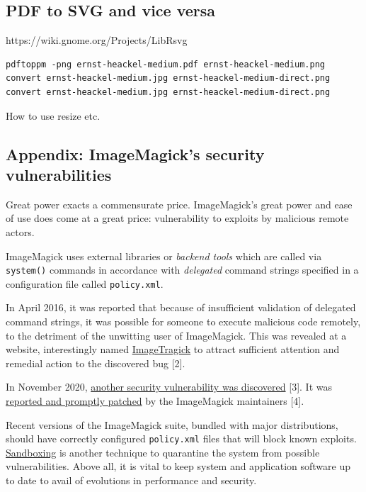 \documentclass[
  11pt,
  british,
  a4paper,
]{article}
\begin{document}
\hypertarget{pdf-to-svg-and-vice-versa}{%
\subsection{PDF to SVG and vice versa}\label{pdf-to-svg-and-vice-versa}}

https://wiki.gnome.org/Projects/LibRsvg

\begin{verbatim}
pdftoppm -png ernst-heackel-medium.pdf ernst-heackel-medium.png
convert ernst-heackel-medium.jpg ernst-heackel-medium-direct.png
convert ernst-heackel-medium.jpg ernst-heackel-medium-direct.png
\end{verbatim}

How to use resize etc.

\hypertarget{appendix-imagemagicks-security-vulnerabilities}{%
\subsection{Appendix: ImageMagick's security
vulnerabilities}\label{appendix-imagemagicks-security-vulnerabilities}}

Great power exacts a commensurate price. ImageMagick's great power and
ease of use does come at a great price: vulnerability to exploits by
malicious remote actors.

ImageMagick uses external libraries or \emph{backend tools} which are
called via \texttt{system()} commands in accordance with
\emph{delegated} command strings specified in a configuration file
called \texttt{policy.xml}.

In April 2016, it was reported that because of insufficient validation
of delegated command strings, it was possible for someone to execute
malicious code remotely, to the detriment of the unwitting user of
ImageMagick. This was revealed at a website, interestingly named
\href{https://imagetragick.com/}{ImageTragick} to attract sufficient
attention and remedial action to the discovered bug {[}2{]}.

In November 2020,
\href{https://portswigger.net/daily-swig/imagemagick-pdf-parsing-flaw-allowed-attacker-to-execute-shell-commands-via-maliciously-crafted-image}{another
security vulnerability was discovered} {[}3{]}. It was
\href{https://insert-script.blogspot.com/2020/11/imagemagick-shell-injection-via-pdf.html}{reported
and promptly patched} by the ImageMagick maintainers {[}4{]}.

Recent versions of the ImageMagick suite, bundled with major
distributions, should have correctly configured \texttt{policy.xml}
files that will block known exploits.
\href{https://www.techopedia.com/definition/25266/sandboxing}{Sandboxing}
is another technique to quarantine the system from possible
vulnerabilities. Above all, it is vital to keep system and application
software up to date to avail of evolutions in performance and security.
\end{document}
